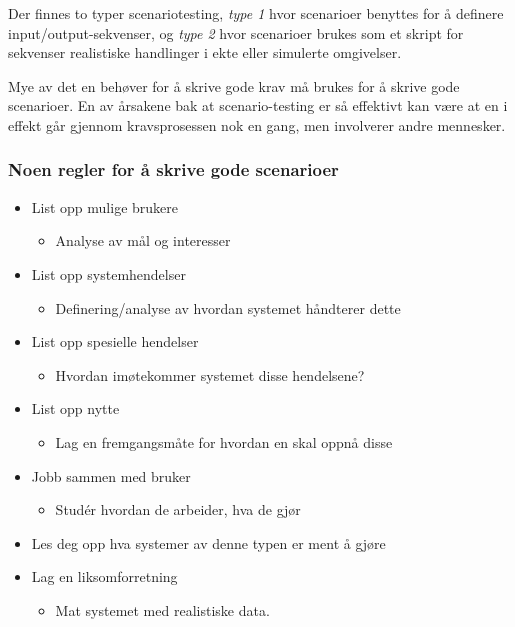 Der finnes to typer scenariotesting, \emph{type 1} hvor scenarioer
benyttes for å definere input/output-sekvenser, og \emph{type 2} hvor
scenarioer brukes som et skript for sekvenser realistiske handlinger i
ekte eller simulerte omgivelser.

Mye av det en behøver for å skrive gode krav må brukes for å skrive gode
scenarioer. En av årsakene bak at scenario-testing er så effektivt kan
være at en i effekt går gjennom kravsprosessen nok en gang, men
involverer andre mennesker.

\subsubsection{Noen regler for å skrive gode scenarioer}

\begin{itemize}
\item
  List opp mulige brukere
  \begin{itemize}
  \item
    Analyse av mål og interesser
  \end{itemize}
\item
  List opp systemhendelser
  \begin{itemize}
  \item
    Definering/analyse av hvordan systemet håndterer dette
  \end{itemize}
\item
  List opp spesielle hendelser
  \begin{itemize}
  \item
    Hvordan imøtekommer systemet disse hendelsene?
  \end{itemize}
\item
  List opp nytte
  \begin{itemize}
  \item
    Lag en fremgangsmåte for hvordan en skal oppnå disse
  \end{itemize}
\item
  Jobb sammen med bruker
  \begin{itemize}
  \item
    Studér hvordan de arbeider, hva de gjør
  \end{itemize}
\item
  Les deg opp hva systemer av denne typen er ment å gjøre
\item
  Lag en liksomforretning
  \begin{itemize}
  \item
    Mat systemet med realistiske data.
  \end{itemize}
\end{itemize}
